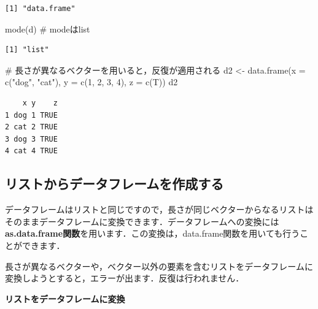 \documentclass[
  letterpaper,
  DIV=11,
  numbers=noendperiod]{scrreprt}
\newenvironment{Shaded}{\begin{snugshade}}{\end{snugshade}}
\newcommand{\AttributeTok}[1]{\textcolor[rgb]{0.40,0.45,0.13}{#1}}
\newcommand{\CommentTok}[1]{\textcolor[rgb]{0.37,0.37,0.37}{#1}}
\newcommand{\DecValTok}[1]{\textcolor[rgb]{0.68,0.00,0.00}{#1}}
\newcommand{\FunctionTok}[1]{\textcolor[rgb]{0.28,0.35,0.67}{#1}}
\newcommand{\NormalTok}[1]{\textcolor[rgb]{0.00,0.23,0.31}{#1}}
\newcommand{\OtherTok}[1]{\textcolor[rgb]{0.00,0.23,0.31}{#1}}
\newcommand{\StringTok}[1]{\textcolor[rgb]{0.13,0.47,0.30}{#1}}
\begin{document}
\begin{verbatim}
[1] "data.frame"
\end{verbatim}

\begin{Shaded}
\begin{Highlighting}[]
\FunctionTok{mode}\NormalTok{(d) }\CommentTok{\# modeはlist}
\end{Highlighting}
\end{Shaded}

\begin{verbatim}
[1] "list"
\end{verbatim}

\begin{Shaded}
\begin{Highlighting}[]
\CommentTok{\# 長さが異なるベクターを用いると，反復が適用される}
\NormalTok{d2 }\OtherTok{\textless{}{-}} \FunctionTok{data.frame}\NormalTok{(}\AttributeTok{x =} \FunctionTok{c}\NormalTok{(}\StringTok{"dog"}\NormalTok{, }\StringTok{"cat"}\NormalTok{), }\AttributeTok{y =} \FunctionTok{c}\NormalTok{(}\DecValTok{1}\NormalTok{, }\DecValTok{2}\NormalTok{, }\DecValTok{3}\NormalTok{, }\DecValTok{4}\NormalTok{), }\AttributeTok{z =} \FunctionTok{c}\NormalTok{(T))}
\NormalTok{d2}
\end{Highlighting}
\end{Shaded}

\begin{verbatim}
    x y    z
1 dog 1 TRUE
2 cat 2 TRUE
3 dog 3 TRUE
4 cat 4 TRUE
\end{verbatim}

\hypertarget{ux30eaux30b9ux30c8ux304bux3089ux30c7ux30fcux30bfux30d5ux30ecux30fcux30e0ux3092ux4f5cux6210ux3059ux308b}{%
\subsection{リストからデータフレームを作成する}\label{ux30eaux30b9ux30c8ux304bux3089ux30c7ux30fcux30bfux30d5ux30ecux30fcux30e0ux3092ux4f5cux6210ux3059ux308b}}

データフレームはリストと同じですので，長さが同じベクターからなるリストはそのままデータフレームに変換できます．データフレームへの変換には\textbf{as.data.frame関数}を用います．この変換は，data.frame関数を用いても行うことができます．

長さが異なるベクターや，ベクター以外の要素を含むリストをデータフレームに変換しようとすると，エラーが出ます．反復は行われません．

\textbf{リストをデータフレームに変換}
\end{document}
